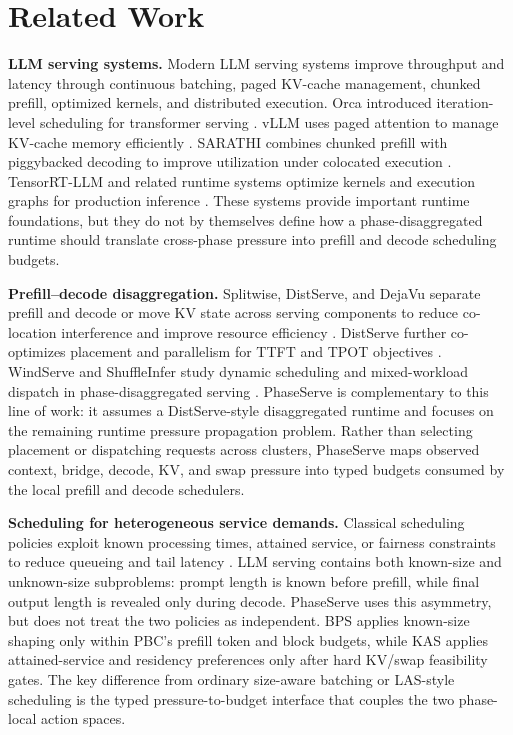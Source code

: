 \documentclass[lettersize,journal]{IEEEtran}
\begin{document}
\section{Related Work}\label{relatedwork}

\textbf{LLM serving systems.} Modern LLM serving systems improve throughput and latency through continuous batching, paged KV-cache management, chunked prefill, optimized kernels, and distributed execution. Orca introduced iteration-level scheduling for transformer serving \cite{orca}. vLLM uses paged attention to manage KV-cache memory efficiently \cite{vllm}. SARATHI combines chunked prefill with piggybacked decoding to improve utilization under colocated execution \cite{sarathi}. TensorRT-LLM and related runtime systems optimize kernels and execution graphs for production inference \cite{tensorrt}. These systems provide important runtime foundations, but they do not by themselves define how a phase-disaggregated runtime should translate cross-phase pressure into prefill and decode scheduling budgets.

\textbf{Prefill--decode disaggregation.} Splitwise, DistServe, and DejaVu separate prefill and decode or move KV state across serving components to reduce co-location interference and improve resource efficiency \cite{b5,distserve,b6}. DistServe further co-optimizes placement and parallelism for TTFT and TPOT objectives \cite{distserve}. WindServe and ShuffleInfer study dynamic scheduling and mixed-workload dispatch in phase-disaggregated serving \cite{windserve,shuffleinfer}. PhaseServe is complementary to this line of work: it assumes a DistServe-style disaggregated runtime and focuses on the remaining runtime pressure propagation problem. Rather than selecting placement or dispatching requests across clusters, PhaseServe maps observed context, bridge, decode, KV, and swap pressure into typed budgets consumed by the local prefill and decode schedulers.

\textbf{Scheduling for heterogeneous service demands.} Classical scheduling policies exploit known processing times, attained service, or fairness constraints to reduce queueing and tail latency \cite{pinedo1992scheduling,nuyens2008foreground}. LLM serving contains both known-size and unknown-size subproblems: prompt length is known before prefill, while final output length is revealed only during decode. PhaseServe uses this asymmetry, but does not treat the two policies as independent. BPS applies known-size shaping only within PBC's prefill token and block budgets, while KAS applies attained-service and residency preferences only after hard KV/swap feasibility gates. The key difference from ordinary size-aware batching or LAS-style scheduling is the typed pressure-to-budget interface that couples the two phase-local action spaces.
\end{document}
